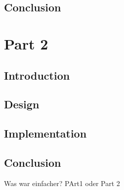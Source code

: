 \documentclass{article}
\begin{document}


\subsection{Conclusion}\label{subsec:01_part1_concl}




\section{Part 2}\label{sec:02_part2}

\subsection{Introduction}\label{subsec:02_part2_intro}

\subsection{Design}\label{subsec:02_part2_design}

\subsection{Implementation}\label{subsec:02_part2_impl}

\subsection{Conclusion}\label{subsec:02_part2_concl}
Was war einfacher? PArt1 oder Part 2




\end{document}
